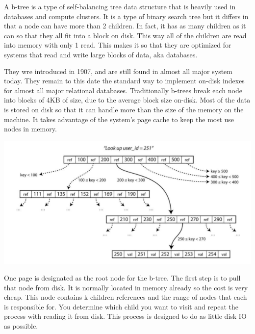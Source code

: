 \documentclass[9pt]{extarticle} %
\begin{document}
\begin{minipage}[t]{.61\linewidth} %
\vspace{-0.4cm}
\hypertarget{firstnews}{}
 
A b-tree is a type of self-balancing tree data structure that is heavily used in databases and
compute clusters. It is a type of binary search tree but it differs in that a node can have more
than 2 children. In fact, it has as many children as it can so that they all fit into a block on
disk. This way all of the children are read into memory with only 1 read. This makes it so that
they are optimized for systems that read and write large blocks of data, aka databases.

They wre introduced in 1907, and are still found in almost all major system today. They remain
to this date the standard way to implement on-disk indexes for almost all major relational
databases. Traditionally b-trees break each node into blocks of 4KB of size, due to the average
block size on-disk. Most of the data is stored on disk so that it can handle more than the size
of the memory on the machine. It takes advantage of the system's page cache to keep the most use
nodes in memory.

\includegraphics[width=0.8\linewidth]{imgs/b-tree.png}

One page is designated as the root node for the b-tree. The first step is to pull that node from
disk. It is normally located in memory already so the cost is very cheap. This node contains k
children references and the range of nodes that each is responsible for. You determine which
child you want to visit and repeat the process with reading it from disk. This process is designed
to do as little disk IO as possible.


\hypertarget{secondnews}{}


\end{minipage}
\end{document}
